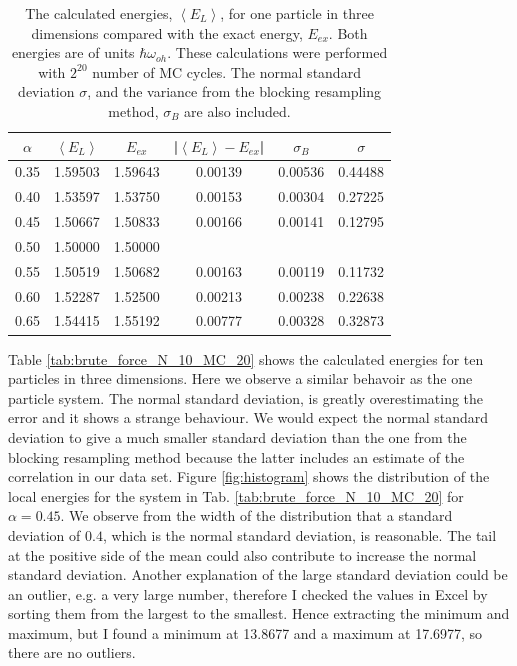 \begin{table}[H]\caption{The calculated energies, $\left<E_L\right>$, for one particle in three dimensions compared with the exact energy, $E_{ex}$. Both energies are of units $\hbar\omega_{oh}$. These calculations were performed with $2^{20}$ number of MC cycles. The normal standard deviation $\sigma$, and the variance from the blocking resampling method, $\sigma_B$ are also included. }\label{tab:brute_force_N_1_MC_20}
\center
\begin{tabular}{cccccc}
$\alpha$ & $\left< E_L \right>$ & $E_{ex}$ & |$\left< E_L \right>-E_{ex}$|  & $\sigma_B$ & $\sigma$\\ \hline
0.35 & 1.59503 & 1.59643 & 0.00139 & 0.00536 & 0.44488\\
0.40 & 1.53597 & 1.53750 & 0.00153 & 0.00304 & 0.27225\\
0.45 & 1.50667 & 1.50833 & 0.00166 & 0.00141 & 0.12795\\
0.50 & 1.50000 & 1.50000 &                &                &                 \\
0.55 & 1.50519 & 1.50682 & 0.00163 & 0.00119 & 0.11732\\
0.60 & 1.52287 & 1.52500 & 0.00213 & 0.00238 & 0.22638\\
0.65 & 1.54415 & 1.55192 & 0.00777 & 0.00328 & 0.32873\\
\end{tabular}
\end{table} 

Table \ref{tab:brute_force_N_10_MC_20} shows the  calculated energies for ten particles in three dimensions. Here we observe a similar behavoir as the one particle system. The normal standard deviation, is greatly overestimating the error and it shows a strange behaviour. We would expect the normal standard deviation to give a much smaller standard deviation than the one from the blocking resampling method because the latter includes an estimate of the correlation in our data set. Figure \ref{fig:histogram} shows the distribution of the local energies for the system in Tab. \ref{tab:brute_force_N_10_MC_20} for $\alpha = 0.45$. We observe from the width of the distribution that a standard deviation of $0.4$, which is the normal standard deviation, is reasonable. The tail at the positive side of the mean could also contribute to increase the normal standard deviation. Another explanation of the large standard deviation could be an outlier, e.g. a very large number, therefore I checked the values in Excel by sorting them from the largest to the smallest. Hence extracting the minimum and maximum, but I found a minimum at 13.8677 and a maximum at 17.6977, so there are no outliers. 


